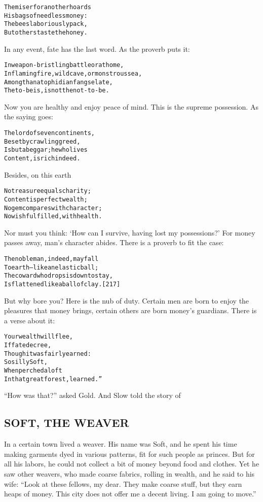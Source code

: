 \documentclass{article}
\renewenvironment{verbatim}{\begin{alltt}\normalfont\begin{centering}}{\end{centering}\end{alltt}}
\begin{document}
\begin{verbatim}
The miser for another hoards
    His bags of needless money:
The bees laboriously pack,
    But others taste the honey.
\end{verbatim}
In any event, fate has the last word. As the proverb puts it:

\begin{verbatim}
In weapon-bristling battle or at home,
    In flaming fire, wild cave, or monstrous sea,
Among thanatophidian fangs elate,
    The to-be is, is not the not-to-be.
\end{verbatim}
Now you are healthy and enjoy peace of mind. This is the supreme
possession. As the saying goes:

\begin{verbatim}
The lord of seven continents,
    Beset by crawling greed,
Is but a beggar; he who lives
    Content, is rich indeed.
\end{verbatim}
Besides, on this earth

\begin{verbatim}
No treasure equals charity;
    Content is perfect wealth;
No gem compares with character;
    No wish fulfilled, with health.
\end{verbatim}
Nor must you think:
`How can I survive, having lost my possessions?' For money passes
away, man's character abides. There is a proverb to fit the case:

\begin{verbatim}
The noble man, indeed, may fall
To earth--like an elastic ball;
The coward who drops is down to stay,
Is flattened like a ball of clay.                       [217]
\end{verbatim}
But why bore you? Here is the nub of duty. Certain men are born to
enjoy the pleasures that money brings, certain others are born
money's guardians. There is a verse about it:

\begin{verbatim}
Your wealth will flee,
If fate decree,
Though it was fairly earned:
    So silly Soft,
    When perched aloft
In that great forest, learned.”
\end{verbatim}
``How was that?'' asked Gold. And Slow told the story of

\subsection{SOFT, THE WEAVER}

In a certain town lived a weaver. His name was Soft, and he spent
his time making garments dyed in various patterns, fit for such
people as princes. But for all his labors, he could not collect a
bit of money beyond food and clothes. Yet he saw other weavers, who
made coarse fabrics, rolling in wealth, and he said to his wife:
``Look at these fellows, my dear. They make coarse stuff, but they earn heaps of money. This city does not offer me a decent living. I am going to move.''
\end{document}
